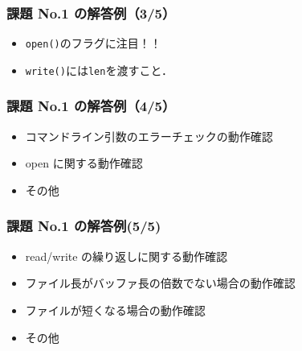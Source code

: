 \documentclass{beamer}                 %
\begin{document}
\begin{frame}[fragile]
  \frametitle{課題 No.1 の解答例（3/5）}
  \begin{itemize}
    \item \texttt{open()}のフラグに注目！！
    \item \texttt{write()}には\texttt{len}を渡すこと．
  \end{itemize}
\end{frame}

\begin{frame}[fragile]
  \frametitle{課題 No.1 の解答例（4/5）}
  \begin{itemize}
    \item コマンドライン引数のエラーチェックの動作確認
    \item open に関する動作確認
    \item その他
  \end{itemize}
\end{frame}

\begin{frame}[fragile]
  \frametitle{課題 No.1 の解答例(5/5)}
  \begin{itemize}
    \item read/write の繰り返しに関する動作確認
    \item ファイル長がバッファ長の倍数でない場合の動作確認
    \item ファイルが短くなる場合の動作確認
    \item その他
  \end{itemize}
\end{frame}
\end{document}
